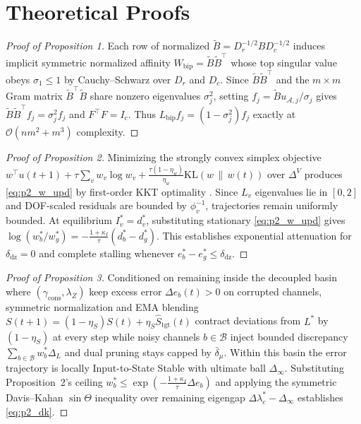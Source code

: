\documentclass[journal]{IEEEtran}
\begin{document}
\appendices
\section{Theoretical Proofs}\label{app:proofs}

\begin{proof}[Proof of Proposition 1]
Each row of normalized $\tilde{B} = D_r^{-1/2} B D_c^{-1/2}$ induces implicit symmetric normalized affinity $W_{\mathrm{bip}} = \tilde{B}\tilde{B}^\top$ whose top singular value obeys $\sigma_1 \le 1$ by Cauchy--Schwarz over $D_r$ and $D_c$. Since $\tilde{B}\tilde{B}^\top$ and the $m \times m$ Gram matrix $\tilde{B}^\top\tilde{B}$ share nonzero eigenvalues $\sigma_j^2$, setting $f_j = \tilde{B} u_{\mathcal{A},j} / \sigma_j$ gives $\tilde{B}\tilde{B}^\top f_j = \sigma_j^2 f_j$ and $F^\top F = I_c$. Thus $L_{\mathrm{bip}} f_j = (1 - \sigma_j^2) f_j$ exactly at $\mathcal{O}(n m^2 + m^3)$ complexity.
\end{proof}

\begin{proof}[Proof of Proposition 2]
Minimizing the strongly convex simplex objective $w^\top u(t+1) + \tau \sum_v w_v \log w_v + \frac{\tau(1-\eta_w)}{\eta_w}\mathrm{KL}(w \,\|\, w(t))$ over $\Delta^V$ produces \eqref{eq:p2_w_upd} by first-order KKT optimality \cite{beck2003mirror}. Since $L_v$ eigenvalues lie in $[0,2]$ and DOF-scaled residuals are bounded by $\phi_v^{-1}$, trajectories remain uniformly bounded. At equilibrium $I_v^* = d_v^*$, substituting stationary \eqref{eq:p2_w_upd} gives $\log(w_b^*/w_g^*) = -\frac{1+\kappa_I}{\tau}(d_b^* - d_g^*)$. This establishes exponential attenuation for $\delta_{\mathrm{dz}} = 0$ and complete stalling whenever $e_b^* - e_g^* \le \delta_{\mathrm{dz}}$.
\end{proof}

\begin{proof}[Proof of Proposition 3]
Conditioned on remaining inside the decoupled basin where $(\gamma_{\mathrm{cons}}, \lambda_Z)$ keep excess error $\Delta e_b(t) > 0$ on corrupted channels, symmetric normalization and EMA blending $S(t+1) = (1-\eta_S)S(t) + \eta_S \hat{S}_{\mathrm{tgt}}(t)$ contract deviations from $L^*$ by $(1-\eta_S)$ at every step while noisy channels $b \in \mathcal{B}$ inject bounded discrepancy $\sum_{b\in\mathcal{B}} w_b^* \Delta_L$ and dual pruning stays capped by $\bar{\delta}_\mu$. Within this basin the error trajectory is locally Input-to-State Stable \cite{sontag1989smooth,sontag2008iss} with ultimate ball $\Delta_\infty$. Substituting Proposition~2's ceiling $w_b^* \le \exp(-\frac{1+\kappa_I}{\tau}\Delta e_b)$ and applying the symmetric Davis--Kahan $\sin\Theta$ inequality \cite{davis1970rotation} over remaining eigengap $\Delta\lambda_c^* - \Delta_\infty$ establishes \eqref{eq:p2_dk}.
\end{proof}
\end{document}
